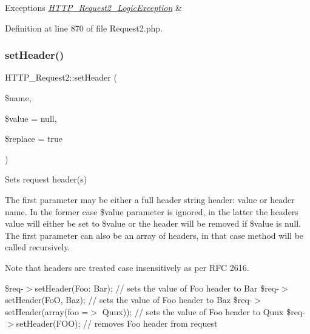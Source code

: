 \begin{DoxyExceptions}{Exceptions}
{\em \hyperlink{classHTTP__Request2__LogicException}{H\+T\+T\+P\+\_\+\+Request2\+\_\+\+Logic\+Exception}} & \\
\hline
\end{DoxyExceptions}


Definition at line 870 of file Request2.\+php.

\hypertarget{classHTTP__Request2_adbdceb126835d75826cc461c27d27b14}{}\label{classHTTP__Request2_adbdceb126835d75826cc461c27d27b14} 
\subsubsection{\texorpdfstring{set\+Header()}{setHeader()}}
{\footnotesize\ttfamily H\+T\+T\+P\+\_\+\+Request2\+::set\+Header (\begin{DoxyParamCaption}\item[{}]{\$name,  }\item[{}]{\$value = {\ttfamily null},  }\item[{}]{\$replace = {\ttfamily true} }\end{DoxyParamCaption})}

Sets request header(s)

The first parameter may be either a full header string \textquotesingle{}header\+: value\textquotesingle{} or header name. In the former case \$value parameter is ignored, in the latter the header\textquotesingle{}s value will either be set to \$value or the header will be removed if \$value is null. The first parameter can also be an array of headers, in that case method will be called recursively.

Note that headers are treated case insensitively as per R\+FC 2616.

{\ttfamily  \$req-\/$>$set\+Header(\textquotesingle{}Foo\+: Bar\textquotesingle{}); // sets the value of \textquotesingle{}Foo\textquotesingle{} header to \textquotesingle{}Bar\textquotesingle{} \$req-\/$>$set\+Header(\textquotesingle{}FoO\textquotesingle{}, \textquotesingle{}Baz\textquotesingle{}); // sets the value of \textquotesingle{}Foo\textquotesingle{} header to \textquotesingle{}Baz\textquotesingle{} \$req-\/$>$set\+Header(array(\textquotesingle{}foo\textquotesingle{} =$>$ \textquotesingle{}Quux\textquotesingle{})); // sets the value of \textquotesingle{}Foo\textquotesingle{} header to \textquotesingle{}Quux\textquotesingle{} \$req-\/$>$set\+Header(\textquotesingle{}F\+OO\textquotesingle{}); // removes \textquotesingle{}Foo\textquotesingle{} header from request }


